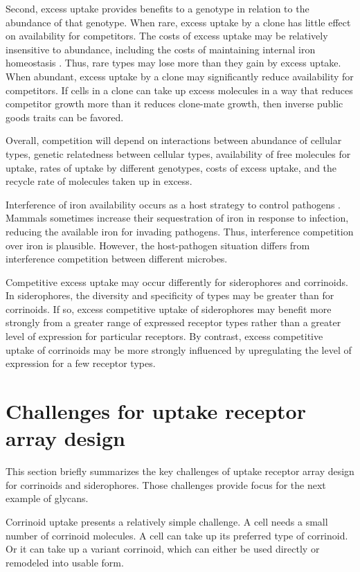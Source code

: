 \documentclass[\mydocfontsize]{article}
\begin{document}
\begin{multicols}{2}
Second, excess uptake provides benefits to a genotype in relation to the abundance of that genotype. When rare, excess uptake by a clone has little effect on availability for competitors. The costs of excess uptake may be relatively insensitive to abundance, including the costs of maintaining internal iron homeostasis \autocite{andrews03bacterial}. Thus, rare types may lose more than they gain by excess uptake. When abundant, excess uptake by a clone may significantly reduce availability for competitors. If cells in a clone can take up excess molecules in a way that reduces competitor growth more than it reduces clone-mate growth, then inverse public goods traits can be favored.

Overall, competition will depend on interactions between abundance of cellular types, genetic relatedness between cellular types, availability of free molecules for uptake, rates of uptake by different genotypes, costs of excess uptake, and the recycle rate of molecules taken up in excess. 

Interference of iron availability occurs as a host strategy to control pathogens \autocite{cherayil11the-role}. Mammals sometimes increase their sequestration of iron in response to infection, reducing the available iron for invading pathogens. Thus, interference competition over iron is plausible. However, the host-pathogen situation differs from interference competition between different microbes.

Competitive excess uptake may occur differently for siderophores and corrinoids. In siderophores, the diversity and specificity of types may be greater than for corrinoids. If so, excess competitive uptake of siderophores may benefit more strongly from a greater range of expressed receptor types rather than a greater level of expression for particular receptors. By contrast, excess competitive uptake of corrinoids may be more strongly influenced by upregulating the level of expression for a few receptor types.

\section{Challenges for uptake receptor array design}

This section briefly summarizes the key challenges of uptake receptor array design for corrinoids and siderophores. Those challenges provide focus for the next example of glycans.

Corrinoid uptake presents a relatively simple challenge. A cell needs a small number of corrinoid molecules. A cell can take up its preferred type of corrinoid. Or it can take up a variant corrinoid, which can either be used directly or remodeled into usable form. 


\end{multicols}
\end{document}
